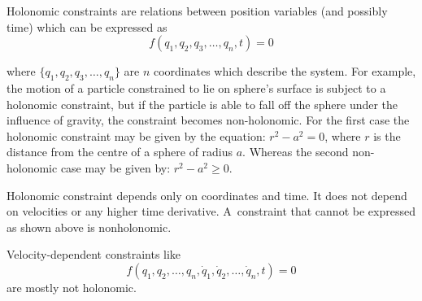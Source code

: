 {\small\setlength{\abovedisplayskip}{2pt}\setlength{\belowdisplayskip}{2pt}

Holonomic constraints are relations between position variables (and possibly time) which can be expressed as
\[ f(q_{1}, q_{2}, q_{3}, \ldots, q_{n}, t) = 0 \]

\noindent where ${\{q_{1},q_{2},q_{3},\ldots,q_{n}\}}$ are $n$ coordinates which describe the system. For example, the motion of a particle constrained to lie on sphere’s surface is subject to a holonomic constraint, but if the particle is able to fall off the sphere under the influence of gravity, the constraint becomes non-holonomic. For the first case the holonomic constraint may be given by the equation: ${r^{2} - a^{2} = 0}$, where $r$ is the distance from the centre of a sphere of radius $a$. Whereas the second non-holonomic case may be given by: ${r^{2} - a^{2} \geq 0}$.

Holonomic constraint depends only on coordinates and time. It does not depend on velocities or any higher time derivative. A~constraint that cannot be expressed as shown above is nonholonomic.

Velocity-dependent constraints like
\[ \displaystyle f(q_{1}, q_{2}, \ldots, q_{n}, {\dot {q}}_{1}, {\dot {q}}_{2}, \ldots, {\dot {q}}_{n}, t) = 0 \]
are mostly not holonomic.
\par}





\label{para:virtualworkprinciple.genericmechanics}

